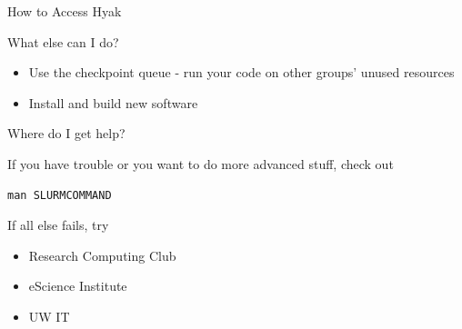 \documentclass[ignorenonframetext,]{beamer}
\begin{document}
\begin{frame}[fragile]{How to Access Hyak}
\begin{block}{What else can I do?}

\begin{itemize}[<+->]
\item
  Use the checkpoint queue - run your code on other groups' unused
  resources
\item
  Install and build new software
\end{itemize}

\end{block}

\begin{block}{Where do I get help?}

If you have trouble or you want to do more advanced stuff, check out

\begin{verbatim}
man SLURMCOMMAND
\end{verbatim}

If all else fails, try

\begin{itemize}[<+->]
\item
  Research Computing Club
\item
  eScience Institute
\item
  UW IT
\end{itemize}

\end{block}

\end{frame}
\end{document}
